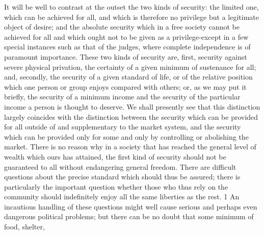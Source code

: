 \documentclass[11pt,openany]{book}
\begin{document}
It will be well to contrast at the outset the two kinds of security: the limited one, which can be achieved for all, and which is therefore no privilege but a legitimate object of desire; and the absolute security which in a free society cannot be achieved for all and which ought not to be given as a privilege-except in a few special instances such as that of the judges, where complete independence is of paramount importance. These two kinds of security are, first, security against severe physical privation, the certainty of a given minimum of sustenance for all; and, secondly, the security of a given standard of life, or of the relative position which one person or group enjoys compared with others; or, as we may put it briefly, the security of a minimum income and the security of the particular income a person is thought to deserve. We shall presently see that this distinction largely coincides with the distinction between the security which can be provided for all outside of and supplementary to the market system, and the security which can be provided only for some and only by controlling or abolishing the market. There is no reason why in a society that has reached the general level of wealth which ours has attained, the first kind of security should not be guaranteed to all without endangering general freedom. There are difficult questions about the precise standard which should thus be assured; there is particularly the important question whether those who thus rely on the community should indefinitely enjoy all the same liberties as the rest. 1 An incautious handling of these questions might well cause serious and perhaps even dangerous political problems; but there can be no doubt that some minimum of food, shelter,
\end{document}
